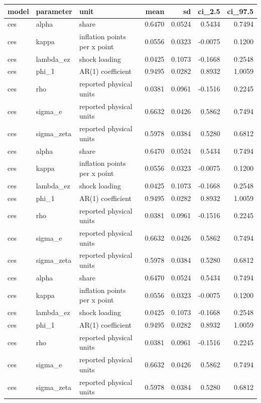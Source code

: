 \begin{tabular}{lllrrrr}
\toprule
model & parameter & unit & mean & sd & ci\_2.5 & ci\_97.5 \\
\midrule
ces & alpha & share & 0.6470 & 0.0524 & 0.5434 & 0.7494 \\
ces & kappa & inflation points per x point & 0.0556 & 0.0323 & -0.0075 & 0.1200 \\
ces & lambda\_ez & shock loading & 0.0425 & 0.1073 & -0.1668 & 0.2548 \\
ces & phi\_1 & AR(1) coefficient & 0.9495 & 0.0282 & 0.8932 & 1.0059 \\
ces & rho & reported physical units & 0.0381 & 0.0961 & -0.1516 & 0.2245 \\
ces & sigma\_e & reported physical units & 0.6632 & 0.0426 & 0.5862 & 0.7494 \\
ces & sigma\_zeta & reported physical units & 0.5978 & 0.0384 & 0.5280 & 0.6812 \\
ces & alpha & share & 0.6470 & 0.0524 & 0.5434 & 0.7494 \\
ces & kappa & inflation points per x point & 0.0556 & 0.0323 & -0.0075 & 0.1200 \\
ces & lambda\_ez & shock loading & 0.0425 & 0.1073 & -0.1668 & 0.2548 \\
ces & phi\_1 & AR(1) coefficient & 0.9495 & 0.0282 & 0.8932 & 1.0059 \\
ces & rho & reported physical units & 0.0381 & 0.0961 & -0.1516 & 0.2245 \\
ces & sigma\_e & reported physical units & 0.6632 & 0.0426 & 0.5862 & 0.7494 \\
ces & sigma\_zeta & reported physical units & 0.5978 & 0.0384 & 0.5280 & 0.6812 \\
ces & alpha & share & 0.6470 & 0.0524 & 0.5434 & 0.7494 \\
ces & kappa & inflation points per x point & 0.0556 & 0.0323 & -0.0075 & 0.1200 \\
ces & lambda\_ez & shock loading & 0.0425 & 0.1073 & -0.1668 & 0.2548 \\
ces & phi\_1 & AR(1) coefficient & 0.9495 & 0.0282 & 0.8932 & 1.0059 \\
ces & rho & reported physical units & 0.0381 & 0.0961 & -0.1516 & 0.2245 \\
ces & sigma\_e & reported physical units & 0.6632 & 0.0426 & 0.5862 & 0.7494 \\
ces & sigma\_zeta & reported physical units & 0.5978 & 0.0384 & 0.5280 & 0.6812 \\

\end{tabular}
